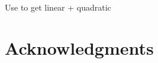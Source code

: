 \documentclass[11pt,draftcls,journal,onecolumn]{../latexlib/latex_ieee/IEEEtran}
\begin{document}
Use \cite{sonnenburg10control} to get linear + quadratic

\section{Acknowledgments}

%


%


\end{document}
